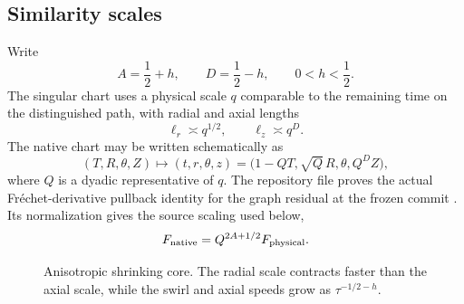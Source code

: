 \documentclass[11pt]{article}
\numberwithin{equation}{section}
\begin{document}
\subsection{Similarity scales}
Write
\begin{equation}
A=\frac12+h,
\qquad
D=\frac12-h,
\qquad
0<h<\frac12.
\label{eq:AD}
\end{equation}
The singular chart uses a physical scale \(q\) comparable to the remaining time on the distinguished path, with radial and axial lengths
\begin{equation}
\ell_r\asymp q^{1/2},
\qquad
\ell_z\asymp q^D.
\label{eq:scales}
\end{equation}
The native chart may be written schematically as
\begin{equation}
(T,R,\theta,Z)\longmapsto
(t,r,\theta,z)=\bigl(1-QT,\sqrt Q\,R,\theta,Q^D Z\bigr),
\label{eq:chart}
\end{equation}
where \(Q\) is a dyadic representative of \(q\).  The repository file  proves the actual Fr\'echet-derivative pullback identity for the graph residual at the frozen commit \cite{OpenAIRepo2026}.  Its normalization gives the source scaling used below,
\begin{equation}
F_{\rm native}=Q^{2A+1/2}F_{\rm physical}.
\label{eq:nativenorm}
\end{equation}

\begin{figure}[ht]
\centering
{}
\caption{Anisotropic shrinking core.  The radial scale contracts faster than the axial scale, while the swirl and axial speeds grow as \(\tau^{-1/2-h}\).}
\label{fig:coregeometry}
\end{figure}
\end{document}
